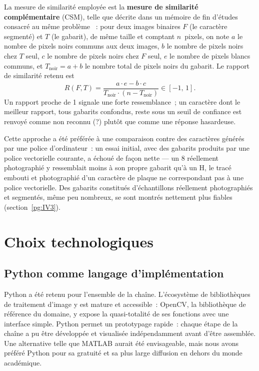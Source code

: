 \documentclass[11pt,a4paper]{article}
\begin{document}
La mesure de similarité employée est la \textbf{mesure de similarité complémentaire} (CSM), telle que décrite dans un mémoire de fin d'études consacré au même problème \cite{ref_blida}~: pour deux images binaires $F$ (le caractère segmenté) et $T$ (le gabarit), de même taille et comptant $n$~pixels, on note $a$ le nombre de pixels noirs communs aux deux images, $b$ le nombre de pixels noirs chez $T$ seul, $c$ le nombre de pixels noirs chez $F$ seul, $e$ le nombre de pixels blancs communs, et $T_{\text{noir}} = a+b$ le nombre total de pixels noirs du gabarit. Le rapport de similarité retenu est
\[
R(F,T) = \frac{a \cdot e - b \cdot c}{T_{\text{noir}} \cdot (n - T_{\text{noir}})} \in [-1,\,1].
\]
Un rapport proche de 1 signale une forte ressemblance~; un caractère dont le meilleur rapport, tous gabarits confondus, reste sous un seuil de confiance est renvoyé comme non reconnu (\og{}?\fg{}) plutôt que comme une réponse hasardeuse.

Cette approche a été préférée à une comparaison contre des caractères générés par une police d'ordinateur~: un essai initial, avec des gabarits produits par une police vectorielle courante, a échoué de façon nette --- un \og{}8\fg{} réellement photographié y ressemblait moins à son propre gabarit qu'à un \og{}H\fg{}, le tracé embouti et photographié d'un caractère de plaque ne correspondant pas à une police vectorielle. Des gabarits constitués d'échantillons réellement photographiés et segmentés, même peu nombreux, se sont montrés nettement plus fiables (section~\ref{pg:IV3}).

\section{Choix technologiques}
\label{pg:II}

\subsection{Python comme langage d'implémentation}
\label{pg:II1}

Python a été retenu pour l'ensemble de la chaîne. L'écosystème de bibliothèques de traitement d'image y est mature et accessible~: OpenCV, la bibliothèque de référence du domaine, y expose la quasi-totalité de ses fonctions avec une interface simple. Python permet un prototypage rapide~: chaque étape de la chaîne a pu être développée et visualisée indépendamment avant d'être assemblée. Une alternative telle que MATLAB aurait été envisageable, mais nous avons préféré Python pour sa gratuité et sa plus large diffusion en dehors du monde académique.
\end{document}
